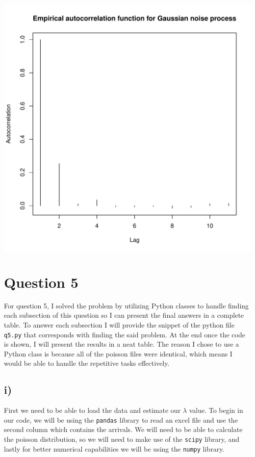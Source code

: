 \documentclass[11pt, letterpaper]{article}
\begin{document}
\begin{center}
	\includegraphics[scale=0.4]{code/q4c}
\end{center}

\section*{Question 5}

For question 5, I solved the problem by utilizing Python classes to handle
finding each subsection of this question
so I can present the final answers in a complete table. To answer each
subsection I will provide the snippet of the python
file \verb|q5.py| that corresponds with finding the said problem. At the end
once the code is shown, I will present the
results in a neat table. The reason I chose to use a Python class is because
all of the poisson files were identical,
which means I would be able to handle the repetitive tasks effectively.

\subsection*{i)}
First we need to be able to load the data and estimate our $\lambda$ value. To
begin in our code, we will be using the
\verb|pandas| library to read an excel file and use the second column which
contains the arrivals. We will need to be able
to calculate the poisson distribution, so we will need to make use of the
\verb|scipy| library, and lastly for better
numerical capabilities we will be using the \verb|numpy| library.
\end{document}
